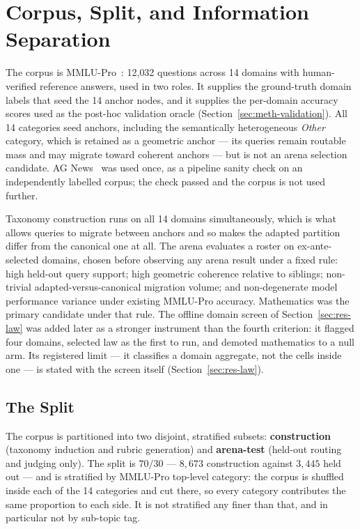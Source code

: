 \section{Corpus, Split, and Information Separation}\label{sec:exp-datasets}

The corpus is MMLU-Pro~\parencite{wang2024mmlupro}: 12{,}032 questions
across 14 domains with human-verified reference answers, used in two
roles. It supplies the ground-truth domain labels that seed the 14
anchor nodes, and it supplies the per-domain accuracy scores used as
the post-hoc validation oracle (Section~\ref{sec:meth-validation}).
All 14 categories seed anchors, including the semantically
heterogeneous \textit{Other} category, which is retained as a geometric
anchor --- its queries remain routable mass and may migrate toward
coherent anchors --- but is not an arena selection candidate.
AG News~\parencite{zhang2015agnews} was used once, as a pipeline sanity
check on an independently labelled corpus; the check passed and the
corpus is not used further.

Taxonomy construction runs on all 14 domains simultaneously, which is
what allows queries to migrate between anchors and so makes the adapted
partition differ from the canonical one at all.
The arena evaluates a roster on ex-ante-selected domains,
chosen before observing any arena result under a fixed rule: high
held-out query support; high geometric coherence relative to siblings;
non-trivial adapted-versus-canonical migration volume; and
non-degenerate model performance variance under existing MMLU-Pro
accuracy. Mathematics was the primary candidate under that rule. The offline
domain screen of Section~\ref{sec:res-law} was added later as a
stronger instrument than the fourth criterion: it flagged four
domains, selected law as the first to run, and demoted mathematics to
a null arm. Its registered limit --- it classifies a domain
aggregate, not the cells inside one --- is stated with the screen
itself (Section~\ref{sec:res-law}).

\subsection{The Split}

The corpus is partitioned into two disjoint, stratified subsets:
\textbf{construction} (taxonomy induction and rubric generation) and
\textbf{arena-test} (held-out routing and judging only). The split is
$70/30$ --- $8{,}673$ construction against $3{,}445$ held out --- and is
stratified by MMLU-Pro top-level category: the corpus is shuffled
inside each of the 14 categories and cut there, so every category
contributes the same proportion to each side. It is not stratified any
finer than that, and in particular not by sub-topic tag.

